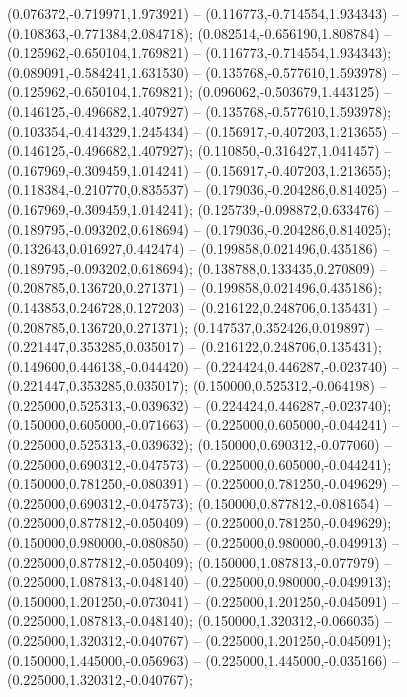 (0.076372,-0.719971,1.973921) -- (0.116773,-0.714554,1.934343) -- (0.108363,-0.771384,2.084718);
 (0.082514,-0.656190,1.808784) -- (0.125962,-0.650104,1.769821) -- (0.116773,-0.714554,1.934343);
 (0.089091,-0.584241,1.631530) -- (0.135768,-0.577610,1.593978) -- (0.125962,-0.650104,1.769821);
 (0.096062,-0.503679,1.443125) -- (0.146125,-0.496682,1.407927) -- (0.135768,-0.577610,1.593978);
 (0.103354,-0.414329,1.245434) -- (0.156917,-0.407203,1.213655) -- (0.146125,-0.496682,1.407927);
 (0.110850,-0.316427,1.041457) -- (0.167969,-0.309459,1.014241) -- (0.156917,-0.407203,1.213655);
 (0.118384,-0.210770,0.835537) -- (0.179036,-0.204286,0.814025) -- (0.167969,-0.309459,1.014241);
 (0.125739,-0.098872,0.633476) -- (0.189795,-0.093202,0.618694) -- (0.179036,-0.204286,0.814025);
 (0.132643,0.016927,0.442474) -- (0.199858,0.021496,0.435186) -- (0.189795,-0.093202,0.618694);
 (0.138788,0.133435,0.270809) -- (0.208785,0.136720,0.271371) -- (0.199858,0.021496,0.435186);
 (0.143853,0.246728,0.127203) -- (0.216122,0.248706,0.135431) -- (0.208785,0.136720,0.271371);
 (0.147537,0.352426,0.019897) -- (0.221447,0.353285,0.035017) -- (0.216122,0.248706,0.135431);
 (0.149600,0.446138,-0.044420) -- (0.224424,0.446287,-0.023740) -- (0.221447,0.353285,0.035017);
 (0.150000,0.525312,-0.064198) -- (0.225000,0.525313,-0.039632) -- (0.224424,0.446287,-0.023740);
 (0.150000,0.605000,-0.071663) -- (0.225000,0.605000,-0.044241) -- (0.225000,0.525313,-0.039632);
 (0.150000,0.690312,-0.077060) -- (0.225000,0.690312,-0.047573) -- (0.225000,0.605000,-0.044241);
 (0.150000,0.781250,-0.080391) -- (0.225000,0.781250,-0.049629) -- (0.225000,0.690312,-0.047573);
 (0.150000,0.877812,-0.081654) -- (0.225000,0.877812,-0.050409) -- (0.225000,0.781250,-0.049629);
 (0.150000,0.980000,-0.080850) -- (0.225000,0.980000,-0.049913) -- (0.225000,0.877812,-0.050409);
 (0.150000,1.087813,-0.077979) -- (0.225000,1.087813,-0.048140) -- (0.225000,0.980000,-0.049913);
 (0.150000,1.201250,-0.073041) -- (0.225000,1.201250,-0.045091) -- (0.225000,1.087813,-0.048140);
 (0.150000,1.320312,-0.066035) -- (0.225000,1.320312,-0.040767) -- (0.225000,1.201250,-0.045091);
 (0.150000,1.445000,-0.056963) -- (0.225000,1.445000,-0.035166) -- (0.225000,1.320312,-0.040767);
